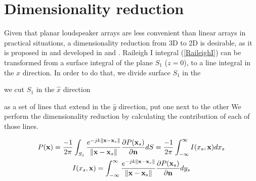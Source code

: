 \section{Dimensionality reduction}
Given that planar loudspeaker arrays are less convenient than linear arrays in practical situations, a dimensionality reduction from 3D to 2D is desirable, as it is proposed in \cite{Vogel} and developed in \cite{Start1997} and  \cite{Verheijen}.
Raileigh I integral (\autoref{RaileighI}) can be transformed from a surface integral of the plane $S_1$ ($z=0$), to a line integral in the $x$ direction. In order to do that, we divide surface $S_1$ in the 

we cut $S_1$ in the $\hat{x}$ direction

as a set of lines that extend in the $\hat{y}$ direction, put one next to the other We perform the dimensionality reduction by calculating the contribution of each of those lines.

\begin{gather}
P(\PosTheo) = \frac{-1}{2\pi} \int_{S_1} \GreenFunc[{\PosTheo - \PosTheo[surface]}] \frac{\partial P(\PosTheo[surface])}{\partial \mathbf{n}} dS = \frac{-1}{2\pi} \int_{-\infty}^{\infty} I(x_s, \PosTheo) dx_s \\
I(x_s, \PosTheo) = \int_{-\infty}^{\infty} \GreenFunc[{\PosTheo - \PosTheo[surface]}] \frac{\partial P(\PosTheo[surface])}{\partial \mathbf{n}} dy_s
\label{LineIntegral}
\end{gather}

